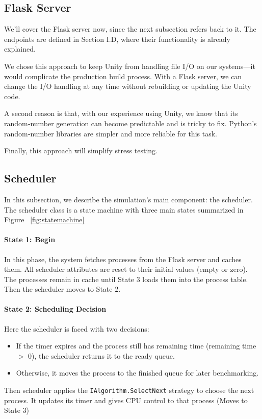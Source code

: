 \documentclass[conference]{IEEEtran}
\begin{document}
\subsection{Flask Server}
We’ll cover the Flask server now, since the next subsection refers back to it. The endpoints are defined in Section I.D, where their functionality is already explained.

We chose this approach to keep Unity from handling file I/O on our systems—it would complicate the production build process. With a Flask server, we can change the I/O handling at any time without rebuilding or updating the Unity code.

A second reason is that, with our experience using Unity, we know that its random‑number generation can become predictable and is tricky to fix. Python’s random‑number libraries are simpler and more reliable for this task.

Finally, this approach will simplify stress testing.

\subsection{Scheduler}
In this subsection, we describe the simulation's main component: the scheduler. The scheduler class is a state machine with three main states summarized in Figure ~\ref{fig:statemachine}

\paragraph{State 1: Begin} 

In this phase, the system fetches processes from the Flask server and caches them. All scheduler attributes are reset to their initial values (empty or zero). The processes remain in cache until State 3 loads them into the process table. Then the scheduler moves to State 2.

\paragraph{State 2: Scheduling Decision}  
Here the scheduler is faced with two decisions:
\begin{itemize}
  \item If the timer expires and the process still has remaining time (remaining time $>$ 0), the scheduler returns it to the ready queue.
  \item Otherwise, it moves the process to the finished queue for later benchmarking.
\end{itemize}
Then scheduler applies the \texttt{IAlgorithm.SelectNext} strategy to choose the next process. It updates its timer and gives CPU control to that process (Moves to State 3)  
\end{document}
